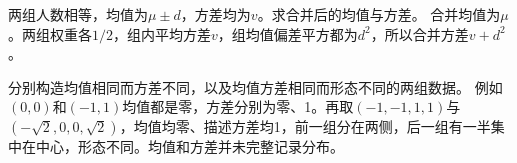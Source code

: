 两组人数相等，均值为\(\mu\pm d\)，方差均为\(v\)。求合并后的均值与方差。
\solutionanswer
合并均值为\(\mu\)。两组权重各\(1/2\)，组内平均方差\(v\)，组均值偏差平方都为\(d^2\)，所以合并方差\(v+d^2\)。


分别构造均值相同而方差不同，以及均值方差相同而形态不同的两组数据。
\solutionanswer
例如\((0,0)\)和\((-1,1)\)均值都是零，方差分别为零、1。再取\((-1,-1,1,1)\)与\((-\sqrt2,0,0,\sqrt2)\)，均值均零、描述方差均1，前一组分在两侧，后一组有一半集中在中心，形态不同。均值和方差并未完整记录分布。
\par
